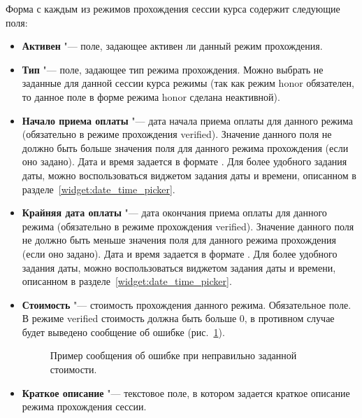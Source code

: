 	Форма с каждым из режимов прохождения сессии курса содержит следующие поля:
	\begin{itemize}
		\item \textbf{Активен} "--- поле, задающее активен ли данный режим прохождения.
		
		\item \textbf{Тип} "--- поле, задающее тип режима прохождения. Можно выбрать не заданные для данной сессии курса режимы (так как режим honor обязателен, то данное поле в форме режима honor сделана неактивной).
		
		\item \textbf{Начало приема оплаты} "--- дата начала приема оплаты для данного режима (обязательно в режиме прохождения verified). Значение данного поля не должно быть больше значения поля  для данного режима прохождения (если оно задано). Дата и время задается в формате . Для более удобного задания даты, можно воспользоваться виджетом задания даты и времени, описанном в разделе~\ref{widget:date_time_picker}.
		
		\item \textbf{Крайняя дата оплаты} "--- дата окончания приема оплаты для данного режима (обязательно в режиме прохождения verified). Значение данного поля не должно быть меньше значения поля  для данного режима прохождения (если оно задано). Дата и время задается в формате . Для более удобного задания даты, можно воспользоваться виджетом задания даты и времени, описанном в разделе~\ref{widget:date_time_picker}.
		
		\item \textbf{Стоимость} "--- стоимость прохождения данного режима. Обязательное поле. В режиме verified стоимость должна быть больше 0, в противном случае будет выведено сообщение об ошибке (рис.~\ref{img:course_session:course_session_mode_cost_error}).
		\begin{figure}[H]
			\caption{Пример сообщения об ошибке при неправильно заданной стоимости.}
			\label{img:course_session:course_session_mode_cost_error}
		\end{figure}
		
		\item \textbf{Краткое описание} "--- текстовое поле, в котором задается краткое описание режима прохождения сессии.
		

\end{itemize}
